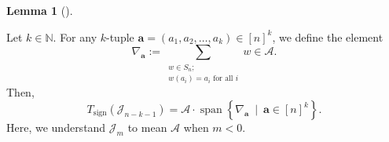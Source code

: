 \documentclass[numbers=enddot,12pt,final,onecolumn,notitlepage]{scrartcl}%
\numberwithin{exer}{subsection}
\theoremstyle{definition}
\newtheorem{lem}[theo]{Lemma}
\newenvironment{lemma}[1][]
{\begin{lem}[#1]\begin{leftbar}}
{\end{leftbar}\end{lem}}
\let\sumnonlimits\sum
\renewcommand{\sum}{\sumnonlimits\limits}
\begin{document}
\begin{lemma}
\label{lem.AnnNnk.2}Let $k\in\mathbb{N}$. For any $k$-tuple $\mathbf{a}%
=\left(  a_{1},a_{2},\ldots,a_{k}\right)  \in\left[  n\right]  ^{k}$, we
define the element%
\begin{equation}
\nabla_{\mathbf{a}}:=\sum_{\substack{w\in S_{n};\\w\left(  a_{i}\right)
=a_{i}\text{ for all }i}}w\in\mathcal{A}. \label{eq.lem.AnnNnk.2.defNab}%
\end{equation}
Then,
\[
T_{\operatorname*{sign}}\left(  \mathcal{J}_{n-k-1}\right)  =\mathcal{A}%
\cdot\operatorname*{span}\left\{  \nabla_{\mathbf{a}}\ \mid\ \mathbf{a}%
\in\left[  n\right]  ^{k}\right\}  .
\]
Here, we understand $\mathcal{J}_{m}$ to mean $\mathcal{A}$ when $m<0$.
\end{lemma}
\end{document}
